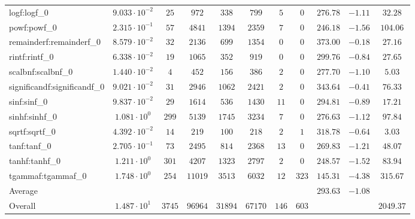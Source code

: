 \begin{tabular}{|l|c|c|c|c|c|c|c|c|c|c|}
logf:logf\_0                 & $ 9.033 \cdot 10^{-2} $ & $ 25     $ & $ 972   $ & $ 338   $ & $ 799   $ & $ 5   $ & $ 0   $ & $ 276.78      $ & $ -1.11   $ & $ 32.28   $ \\
powf:powf\_0                 & $ 2.315 \cdot 10^{-1} $ & $ 57     $ & $ 4841  $ & $ 1394  $ & $ 2359  $ & $ 7   $ & $ 0   $ & $ 246.18      $ & $ -1.56   $ & $ 104.06  $ \\
remainderf:remainderf\_0     & $ 8.579 \cdot 10^{-2} $ & $ 32     $ & $ 2136  $ & $ 699   $ & $ 1354  $ & $ 0   $ & $ 0   $ & $ 373.00      $ & $ -0.18   $ & $ 27.16   $ \\
rintf:rintf\_0               & $ 6.338 \cdot 10^{-2} $ & $ 19     $ & $ 1065  $ & $ 352   $ & $ 919   $ & $ 0   $ & $ 0   $ & $ 299.76      $ & $ -0.84   $ & $ 27.65   $ \\
scalbnf:scalbnf\_0           & $ 1.440 \cdot 10^{-2} $ & $ 4      $ & $ 452   $ & $ 156   $ & $ 386   $ & $ 2   $ & $ 0   $ & $ 277.70      $ & $ -1.10   $ & $ 5.03    $ \\
significandf:significandf\_0 & $ 9.021 \cdot 10^{-2} $ & $ 31     $ & $ 2946  $ & $ 1062  $ & $ 2421  $ & $ 2   $ & $ 0   $ & $ 343.64      $ & $ -0.41   $ & $ 76.33   $ \\
sinf:sinf\_0                 & $ 9.837 \cdot 10^{-2} $ & $ 29     $ & $ 1614  $ & $ 536   $ & $ 1430  $ & $ 11  $ & $ 0   $ & $ 294.81      $ & $ -0.89   $ & $ 17.21   $ \\
sinhf:sinhf\_0               & $ 1.081 \cdot 10^{0}  $ & $ 299    $ & $ 5139  $ & $ 1745  $ & $ 3234  $ & $ 7   $ & $ 0   $ & $ 276.63      $ & $ -1.12   $ & $ 97.84   $ \\
sqrtf:sqrtf\_0               & $ 4.392 \cdot 10^{-2} $ & $ 14     $ & $ 219   $ & $ 100   $ & $ 218   $ & $ 2   $ & $ 1   $ & $ 318.78      $ & $ -0.64   $ & $ 3.03    $ \\
tanf:tanf\_0                 & $ 2.705 \cdot 10^{-1} $ & $ 73     $ & $ 2495  $ & $ 814   $ & $ 2368  $ & $ 13  $ & $ 0   $ & $ 269.83      $ & $ -1.21   $ & $ 48.07   $ \\
tanhf:tanhf\_0               & $ 1.211 \cdot 10^{0}  $ & $ 301    $ & $ 4207  $ & $ 1323  $ & $ 2797  $ & $ 2   $ & $ 0   $ & $ 248.57      $ & $ -1.52   $ & $ 83.94   $ \\
tgammaf:tgammaf\_0           & $ 1.748 \cdot 10^{0}  $ & $ 254    $ & $ 11019 $ & $ 3513  $ & $ 6032  $ & $ 12  $ & $ 323 $ & $ 145.31      $ & $ -4.38   $ & $ 315.67  $ \\
\hline
Average                      & $                     $ & $        $ & $       $ & $       $ & $       $ & $     $ & $     $ & $ 293.63      $ & $ -1.08   $ & $         $ \\
\hline
Overall                      & $ 1.487 \cdot 10^{1}  $ & $ 3745   $ & $ 96964 $ & $ 31894 $ & $ 67170 $ & $ 146 $ & $ 603 $ & $             $ & $         $ & $ 2049.37 $ \\
\hline
\end{tabular}
